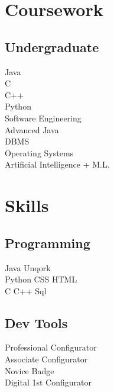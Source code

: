\documentclass[]{deedy-resume-openfont}
\begin{document}
\begin{minipage}[t]{0.33\textwidth}

\section{Coursework}
\subsection{Undergraduate}
 Java\\
 C\\
 C++\\
 Python\\
Software Engineering \\
Advanced Java\\
DBMS\\
Operating Systems \\
Artificial Intelligence + M.L. \\
\sectionsep




\section{Skills}
\subsection{Programming}
Java \textbullet{} Unqork  \\
Python \textbullet{} CSS \textbullet{} HTML \\
C \textbullet{} C++ \textbullet{} Sql
\sectionsep
\subsection{Dev Tools}
\textbullet{}Professional Configurator \\
\textbullet{}Associate Configurator\\ 
\textbullet{}Novice Badge  \\
\textbullet{}Digital 1st Configurator
\sectionsep


%
%

\end{minipage} 
\end{document}

